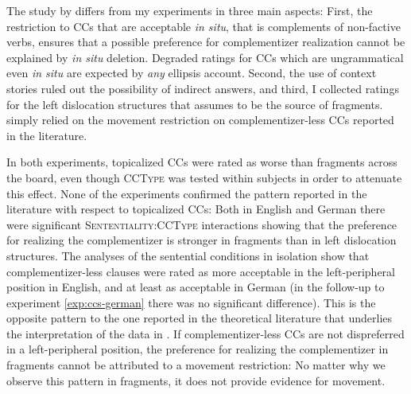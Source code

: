 The study by \citet{merchant.etal2013} differs from my experiments in three main aspects: First, the restriction to CCs that are acceptable \textit{in situ}, that is complements of non-factive verbs, ensures that a possible preference for complementizer realization cannot be explained by \textit{in situ} deletion. Degraded ratings for CCs which are ungrammatical even \textit{in situ} are expected by \textit{any} ellipsis account. Second, the use of context stories ruled out the possibility of indirect answers, and third, I collected ratings for the left dislocation structures that \citet{merchant2004} assumes to be the source of fragments. \citet{merchant.etal2013} simply relied on the movement restriction on complementizer-less CCs reported in the literature. 

In both experiments, topicalized CCs were rated as worse than fragments across the board, even though \textsc{CCType} was tested within subjects in order to attenuate this effect. None of the experiments confirmed the pattern reported in the literature with respect to topicalized CCs: Both in English and German there were significant \textsc{Sententiality:CCType} interactions showing that the preference for realizing the complementizer is stronger in fragments than in left dislocation structures. The analyses of the sentential conditions in isolation show that complementizer-less clauses were rated as more acceptable in the left-peripheral position in English, and at least as acceptable in German (in the follow-up to experiment \ref{exp:ccs-german} there was no significant difference). This is the opposite pattern to the one reported in the theoretical literature that underlies the interpretation of the data in \citet{merchant.etal2013}. If complementizer-less CCs are not dispreferred in a left-peripheral position, the preference for realizing the complementizer in fragments cannot be attributed to a movement restriction: No matter why we observe this pattern in fragments, it does not provide evidence for movement.

